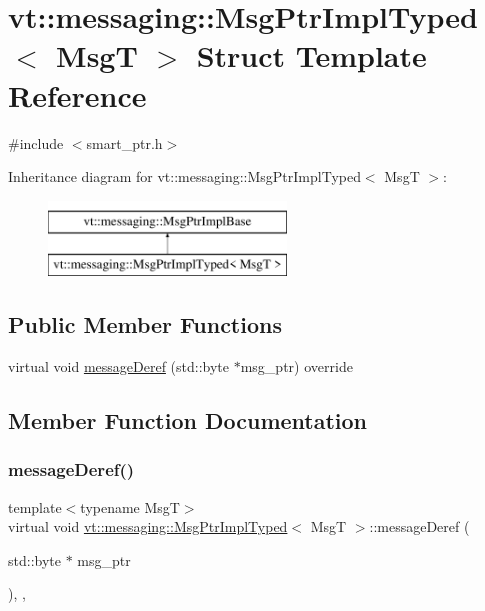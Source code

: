 \hypertarget{structvt_1_1messaging_1_1_msg_ptr_impl_typed}{}\section{vt\+:\+:messaging\+:\+:Msg\+Ptr\+Impl\+Typed$<$ MsgT $>$ Struct Template Reference}
\label{structvt_1_1messaging_1_1_msg_ptr_impl_typed}


{\ttfamily \#include $<$smart\+\_\+ptr.\+h$>$}

Inheritance diagram for vt\+:\+:messaging\+:\+:Msg\+Ptr\+Impl\+Typed$<$ MsgT $>$\+:\begin{figure}[H]
\begin{center}
\leavevmode
\includegraphics[height=2.000000cm]{structvt_1_1messaging_1_1_msg_ptr_impl_typed}
\end{center}
\end{figure}
\subsection*{Public Member Functions}
\begin{DoxyCompactItemize}
\item 
virtual void \hyperlink{structvt_1_1messaging_1_1_msg_ptr_impl_typed_a3aa429eed4e71205e675d8b9417daf92}{message\+Deref} (std\+::byte $\ast$msg\+\_\+ptr) override
\end{DoxyCompactItemize}


\subsection{Member Function Documentation}
\mbox{\label{structvt_1_1messaging_1_1_msg_ptr_impl_typed_a3aa429eed4e71205e675d8b9417daf92}} 
\subsubsection{\texorpdfstring{message\+Deref()}{messageDeref()}}
{\footnotesize\ttfamily template$<$typename MsgT$>$ \\
virtual void \hyperlink{structvt_1_1messaging_1_1_msg_ptr_impl_typed}{vt\+::messaging\+::\+Msg\+Ptr\+Impl\+Typed}$<$ MsgT $>$\+::message\+Deref (\begin{DoxyParamCaption}\item[{std\+::byte $\ast$}]{msg\+\_\+ptr }\end{DoxyParamCaption})\hspace{0.3cm}{\ttfamily [inline]}, {\ttfamily [override]}, {\ttfamily [virtual]}}

